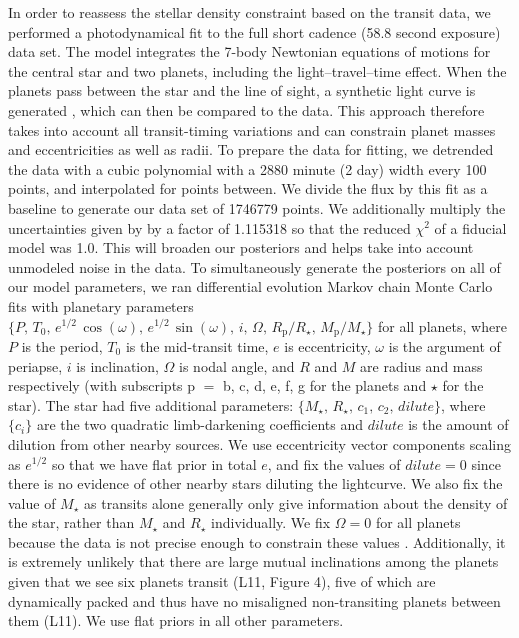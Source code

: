 \documentclass[oneside]{emulateapj}
\begin{document}
In order to reassess the stellar density constraint based on the transit data, we performed a photodynamical fit to the full \Kepler short cadence (58.8 second exposure) data set. The model integrates the 7-body Newtonian equations of motions for the central star and two planets, including the light--travel--time effect. When the planets pass between the star and the line of sight, a synthetic light curve is generated \citep{2012MNRAS.420.1630P}, which can then be compared to the data. This approach therefore takes into account all transit-timing variations and can constrain planet masses and eccentricities as well as radii. To prepare the data for fitting, we detrended the data with a cubic polynomial with a 2880 minute (2 day) width every 100 points, and interpolated for points between. We divide the flux by this fit as a baseline to generate our data set of 1746779 points. We additionally multiply the uncertainties given by \Kepler by a factor of 1.115318 so that the reduced $\chi^2$ of a fiducial model was 1.0. This will broaden our posteriors and helps take into account unmodeled noise in the data. To simultaneously generate the posteriors on all of our model parameters, we ran differential evolution Markov chain Monte Carlo \cite[DEMCMC, ][]{TerBraak2005} fits with planetary parameters $\{P,\, T_0,\, e^{1/2} \, \cos(\omega),\, e^{1/2} \, \sin(\omega),\, i,\, \Omega,\, R_\mathrm{p}/R_\star,\, M_\mathrm{p}/M_\star\}$ for all planets, where $P$ is the period, $T_0$ is the mid-transit time, $e$ is eccentricity, $\omega$ is the argument of periapse, $i$ is inclination, $\Omega$ is nodal angle, and $R$ and $M$ are radius and mass respectively (with subscripts p $=$ b, c, d, e, f, g for the planets and $\star$ for the star). The star had five additional parameters: $\{M_\star,\, R_\star,\, c_1,\, c_2,\, dilute\}$, where $\{c_i\}$ are the two quadratic limb-darkening coefficients and $dilute$ is the amount of dilution from other nearby sources. We use eccentricity vector components scaling as $e^{1/2}$ so that we have flat prior in total $e$, and fix the values of $dilute=0$ since there is no evidence of other nearby stars diluting the lightcurve. We also fix the value of $M_\star$ as transits alone generally only give information about the density of the star, rather than $M_\star$ and $R_\star$ individually. We fix $\Omega = 0$ for all planets because the data is not precise enough to constrain these values \citep{Migaszewski2012}. Additionally, it is extremely unlikely that there are large mutual inclinations among the planets given that we see six planets transit (L11, Figure 4), five of which are dynamically packed and thus have no misaligned non-transiting planets between them (L11). We use flat priors in all other parameters.
\end{document}
